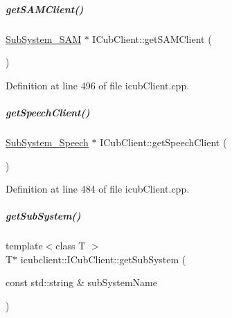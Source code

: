 \mbox{\label{group__icubclient__clients_ae255d014e106fbbae51f56e670093610}} 
\subparagraph{\texorpdfstring{get\+S\+A\+M\+Client()}{getSAMClient()}}
{\footnotesize\ttfamily \hyperlink{group__icubclient__subsystems_classicubclient_1_1SubSystem__SAM}{Sub\+System\+\_\+\+S\+AM} $\ast$ I\+Cub\+Client\+::get\+S\+A\+M\+Client (\begin{DoxyParamCaption}{ }\end{DoxyParamCaption})}



Definition at line 496 of file icub\+Client.\+cpp.

\mbox{\label{group__icubclient__clients_ab0c540ef27084c3845c4bf102808bb83}} 
\subparagraph{\texorpdfstring{get\+Speech\+Client()}{getSpeechClient()}}
{\footnotesize\ttfamily \hyperlink{group__icubclient__subsystems_classicubclient_1_1SubSystem__Speech}{Sub\+System\+\_\+\+Speech} $\ast$ I\+Cub\+Client\+::get\+Speech\+Client (\begin{DoxyParamCaption}{ }\end{DoxyParamCaption})}



Definition at line 484 of file icub\+Client.\+cpp.

\mbox{\label{group__icubclient__clients_a7ad0d4360f735c3631b2bdaa3caa5d80}} 
\subparagraph{\texorpdfstring{get\+Sub\+System()}{getSubSystem()}\hspace{0.1cm}{\footnotesize\ttfamily [1/2]}}
{\footnotesize\ttfamily template$<$class T $>$ \\
T$\ast$ icubclient\+::\+I\+Cub\+Client\+::get\+Sub\+System (\begin{DoxyParamCaption}\item[{const std\+::string \&}]{sub\+System\+Name }\end{DoxyParamCaption})\hspace{0.3cm}{\ttfamily [inline]}}



